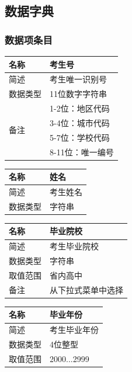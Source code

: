 \documentclass[CJK,utf8]{ctexrep}
\begin{document}
\subsection*{数据字典}

%
%

\subsubsection*{数据项条目}

\begin{tabularx}{0.85\textwidth}{|l|X|}
	\hline
	\textbf{名称} & \textbf{考生号} \\
	\hline
	简述 & 考生唯一识别号 \\
	\hline
	数据类型 & 11位数字字符串 \\
	\hline
	\multirow{4}{*}{备注}
	& 1-2位：地区代码 \\
	& 3-4位：城市代码 \\
	& 5-7位：学校代码 \\
	& 8-11位：唯一编号 \\
	\hline
\end{tabularx}

\begin{tabularx}{0.85\textwidth}{|l|X|}
	\hline
	\textbf{名称} & \textbf{姓名} \\
	\hline
	简述 & 考生姓名 \\
	\hline
	数据类型 & 字符串 \\
	\hline
\end{tabularx}

\begin{tabularx}{0.85\textwidth}{|l|X|}
	\hline
	\textbf{名称} & \textbf{毕业院校} \\
	\hline
	简述 & 考生毕业院校 \\
	\hline
	数据类型 & 字符串 \\
	\hline
	取值范围 & 省内高中 \\
	\hline
	备注 & 从下拉式菜单中选择 \\
	\hline
\end{tabularx}

\begin{tabularx}{0.85\textwidth}{|l|X|}
	\hline
	\textbf{名称} & \textbf{毕业年份} \\
	\hline
	简述 & 考生毕业年份 \\
	\hline
	数据类型 & 4位整型 \\
	\hline
	取值范围 & 2000...2999 \\
	\hline
\end{tabularx}
\end{document}
